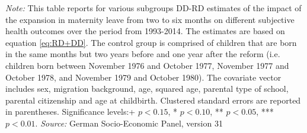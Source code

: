 \documentclass[a4paper ]{article}
\newlength\FHoffset
\begin{document}
\begin{table}[p] \centering
\def\sym#1{\ifmmode^{#1}\else\(^{#1}\)\fi}
\caption{Heterogenity Analysis for Subjective Health Outcomes, DD-RD Estimates with Covariates}\label{tab:Heterog_SHCV}
\begin{minipage}{0.98\textwidth} %
{\footnotesize \textit{Note:} This table reports for various subgroups DD-RD estimates of the impact of the expansion in maternity leave from two to six months on different subjective health outcomes over the period from 1993-2014. The estimates are based on equation \ref{eq:RD+DD}. The control group is comprised of children that are born in the same months but two years before and one year after the reform (i.e. children born between November 1976 and October 1977, November 1977 and October 1978, and November 1979 and October 1980). The covariate vector includes sex, migration background, age, squared age, parental type of school, parental citizenship and age at childbirth.\newline
Clustered standard errors are reported in parentheses. Significance levels:+ \(p<0.15\), * \(p<0.10\), ** \(p<0.05\), *** \(p<0.01\). \newline \textit{Source: }German Socio-Economic Panel, version 31\par}
\end{minipage}
\end{table}
\restoregeometry

\newpage
{}	
	

	
		\setlength\FHoffset{-2.5cm} 
\fancyheadoffset{\FHoffset}
\end{document}
